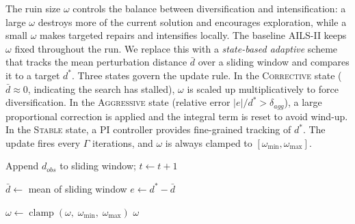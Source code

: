 The ruin size $\omega$ controls the balance between diversification and intensification: a large $\omega$ destroys more of the current solution and encourages exploration, while a small $\omega$ makes targeted repairs and intensifies locally.
The baseline AILS-II keeps $\omega$ fixed throughout the run.
We replace this with a \emph{state-based adaptive} scheme that tracks the mean perturbation distance $\bar{d}$ over a sliding window and compares it to a target $d^*$.
Three states govern the update rule.
In the \textsc{Corrective} state ($\bar{d} \approx 0$, indicating the search has stalled), $\omega$ is scaled up multiplicatively to force diversification.
In the \textsc{Aggressive} state (relative error $|e|/d^* > \delta_{\textit{agg}}$), a large proportional correction is applied and the integral term is reset to avoid wind-up.
In the \textsc{Stable} state, a PI controller provides fine-grained tracking of $d^*$.
The update fires every $\Gamma$ iterations, and $\omega$ is always clamped to $[\omega_{\min}, \omega_{\max}]$.

\begin{algorithm}[t]
\caption{State-Based Adaptive $\omega$ Adjustment}
\label{alg:omega}

\BlankLine
{}
Append $d_{\textit{obs}}$ to sliding window; $t \leftarrow t + 1$\;

\BlankLine
$\bar{d} \leftarrow$ mean of sliding window\;
$e \leftarrow d^* - \bar{d}$\;

\BlankLine
{}

\BlankLine
{}

\BlankLine
$\omega \leftarrow \operatorname{clamp}(\omega,\; \omega_{\min},\; \omega_{\max})$\;
\Return $\omega$\;
\end{algorithm}
